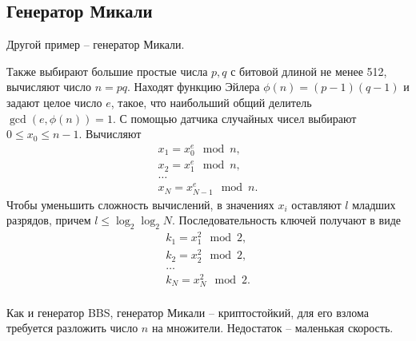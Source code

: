 \subsection{Генератор Микали}

Другой пример -- генератор Микали.

Также выбирают большие простые числа $p,q$ с битовой длиной не менее 512, вычисляют число $n = pq$. Находят функцию Эйлера $\phi(n) = (p-1) (q-1)$ и задают целое число $e$, такое, что наибольший общий делитель $\gcd(e, \phi(n)) = 1$. С помощью датчика случайных чисел выбирают $0 \leq x_{0} \leq n-1$. Вычисляют
\[ \begin{array}{l}
    x_1 = x_0^e \mod n, \\
    x_2 = x_1^e \mod n, \\
    \dots \\
    x_N = x_{N-1}^e \mod n.
\end{array} \]
Чтобы уменьшить сложность вычислений, в значениях $x_i$ оставляют $l$ младших разрядов, причем $l \leq \log_2 \log_2 N$. Последовательность ключей получают в виде
\[ \begin{array}{l}
    k_1 = x_1^2 \mod 2, \\
    k_2 = x_2^2 \mod 2, \\
    \dots \\
    k_N = x_N^2 \mod 2. \\
\end{array} \]

Как и генератор BBS, генератор Микали -- криптостойкий, для его взлома требуется разложить число $n$ на множители. Недостаток -- маленькая скорость.